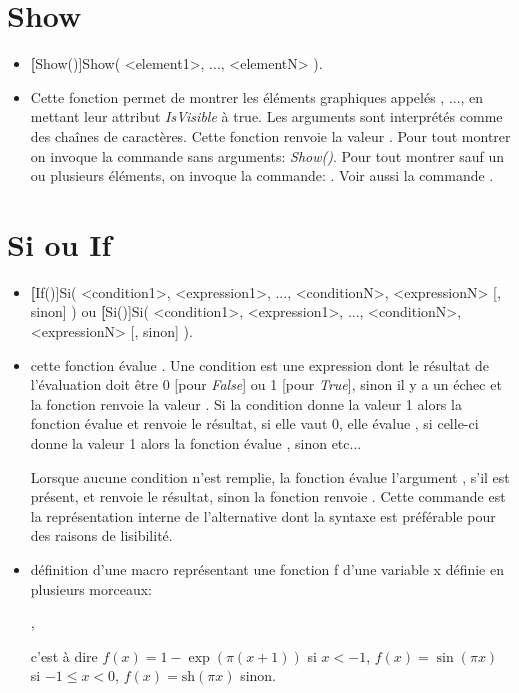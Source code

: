 \section{Show}\label{cmdShow}

\begin{itemize}
 \item \util \textbf[Show()]{Show( <element1>, ..., <elementN> )}.
 \item \desc Cette fonction permet de montrer les éléments graphiques appelés , ...,  en mettant leur attribut \textsl{IsVisible} à true. Les arguments sont interprétés comme des chaînes de caractères. Cette fonction renvoie la valeur \Nil. Pour tout montrer on invoque la commande sans arguments: \textsl{Show()}. Pour tout montrer sauf un ou plusieurs éléments, on invoque la commande: . Voir aussi la commande .
\end{itemize}


\section{Si ou If}\label{cmdSi}

\begin{itemize}
 \item \util \textbf[If()]{Si( <condition1>, <expression1>, ..., <conditionN>, <expressionN> [, sinon] )} ou \textbf[Si()]{Si( <condition1>, <expression1>, ..., <conditionN>, <expressionN> [, sinon] )}.
 \item \desc  cette fonction évalue . Une condition est une expression dont le résultat de l'évaluation doit être 0 [pour \textit{False}] ou 1 [pour \textit{True}], sinon il y a un échec et la fonction renvoie la valeur \Nil. Si la condition donne la valeur 1 alors la fonction évalue  et renvoie le résultat, si elle vaut 0, elle évalue , si celle-ci donne la valeur 1 alors la fonction évalue , sinon etc... 
 
  Lorsque aucune condition n'est remplie, la fonction évalue l'argument , s'il est présent, et renvoie le résultat, sinon la fonction renvoie \Nil. Cette commande est la représentation interne de l'alternative  dont la syntaxe est préférable pour des raisons de lisibilité.
 \item \exem définition d'une macro  représentant une fonction f d'une variable x définie en plusieurs morceaux:
 
\centerline{,}

c'est à dire $f(x)=1-\exp(\pi(x+1))$ si $x<-1$, $f(x)=\sin(\pi x)$ si $-1\leqslant x<0$, $f(x)=\mathrm{sh}(\pi x)$ sinon.

\end{itemize}


